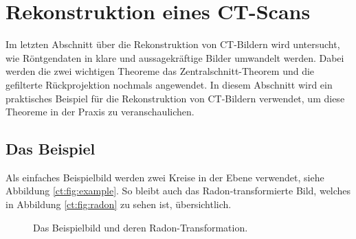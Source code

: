 %
%
%
%
\section{Rekonstruktion eines CT-Scans
\label{ct:section:rekonstruktion}}
Im letzten Abschnitt über die Rekonstruktion von CT-Bildern wird untersucht, wie Röntgendaten in klare und aussagekräftige Bilder umwandelt werden. Dabei werden die zwei wichtigen Theoreme das Zentralschnitt-Theorem und die gefilterte Rückprojektion nochmals angewendet. In diesem Abschnitt wird ein praktisches Beispiel für die Rekonstruktion von CT-Bildern verwendet, um diese Theoreme in der Praxis zu veranschaulichen. 

\subsection{Das Beispiel
\label{ct:subsection:Beispiel}}
Als einfaches Beispielbild werden zwei Kreise in der Ebene verwendet, siehe Abbildung \ref{ct:fig:example}. So bleibt auch das Radon-transformierte Bild, welches in Abbildung \ref{ct:fig:radon} zu sehen ist, übersichtlich.

\begin{figure}
	\centering
	\caption{Das Beispielbild und deren Radon-Transformation.}
\end{figure}


